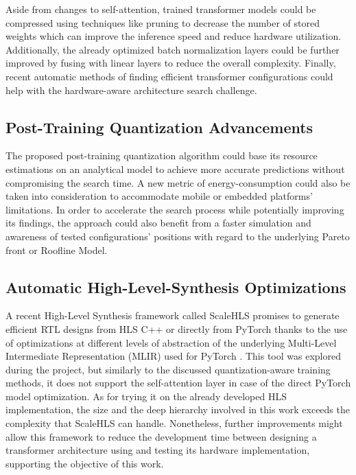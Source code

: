 Aside from changes to self-attention, trained transformer models could be compressed using techniques like pruning to decrease the number of stored weights which can improve the inference speed and reduce hardware utilization. Additionally, the already optimized batch normalization layers could be further improved by fusing with linear layers to reduce the overall complexity. Finally, recent automatic methods of finding efficient transformer configurations \cite{83-tsai2020finding,84-su2021vitas:} could help with the hardware-aware architecture search challenge.

\subsection{Post-Training Quantization Advancements}
The proposed post-training quantization algorithm could base its resource estimations on an analytical model to achieve more accurate predictions without compromising the search time. A new metric of energy-consumption could also be taken into consideration to accommodate mobile or embedded platforms' limitations. In order to accelerate the search process while potentially improving its findings, the approach could also benefit from a faster simulation and awareness of tested configurations' positions with regard to the underlying Pareto front or Roofline Model.

\subsection{Automatic High-Level-Synthesis Optimizations}
A recent High-Level Synthesis framework called ScaleHLS \cite{ye2021scalehls} promises to generate efficient RTL designs from HLS C++ or directly from PyTorch thanks to the use of optimizations at different levels of abstraction of the underlying Multi-Level Intermediate Representation (MLIR) \cite{mlir} used for PyTorch \cite{86-llvm2020torch-mlir}. This tool was explored during the project, but similarly to the discussed quantization-aware training methods, it does not support the self-attention layer in case of the direct PyTorch model optimization. As for trying it on the already developed HLS implementation, the size and the deep hierarchy involved in this work exceeds the complexity that ScaleHLS can handle. Nonetheless, further improvements might allow this framework to reduce the development time between designing a transformer architecture using \hlsml and testing its hardware implementation, supporting the objective of this work.

